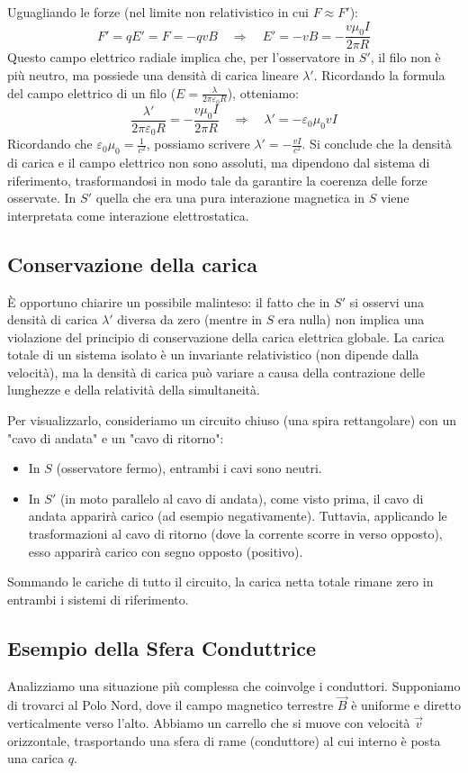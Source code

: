 \documentclass{book}
\begin{document}
Uguagliando le forze (nel limite non relativistico in cui $F \approx F'$):
$$
F' = qE' = F = -qvB \quad \Rightarrow \quad E' = -vB = -\frac{v\mu_0I}{2\pi R}
$$
Questo campo elettrico radiale implica che, per l'osservatore in $S'$, il filo non è più neutro, ma possiede una densità di carica lineare $\lambda'$. Ricordando la formula del campo elettrico di un filo ($E = \frac{\lambda}{2\pi \varepsilon_0 R}$), otteniamo:
$$
\frac{\lambda'}{2\pi \varepsilon_0 R} = -\frac{v\mu_0I}{2\pi R} \quad \Rightarrow \quad \lambda' = -\varepsilon_0\mu_0 v I
$$
Ricordando che $\varepsilon_0 \mu_0 = \frac{1}{c^2}$, possiamo scrivere $\lambda' = -\frac{vI}{c^2}$.
Si conclude che la densità di carica e il campo elettrico non sono assoluti, ma dipendono dal sistema di riferimento, trasformandosi in modo tale da garantire la coerenza delle forze osservate. In $S'$ quella che era una pura interazione magnetica in $S$ viene interpretata come interazione elettrostatica.

\subsection*{Conservazione della carica}
È opportuno chiarire un possibile malinteso: il fatto che in $S'$ si osservi una densità di carica $\lambda'$ diversa da zero (mentre in $S$ era nulla) non implica una violazione del principio di conservazione della carica elettrica globale. La carica totale di un sistema isolato è un invariante relativistico (non dipende dalla velocità), ma la densità di carica può variare a causa della contrazione delle lunghezze e della relatività della simultaneità.

Per visualizzarlo, consideriamo un circuito chiuso (una spira rettangolare) con un "cavo di andata" e un "cavo di ritorno":
\begin{itemize}
    \item In $S$ (osservatore fermo), entrambi i cavi sono neutri.
    \item In $S'$ (in moto parallelo al cavo di andata), come visto prima, il cavo di andata apparirà carico (ad esempio negativamente). Tuttavia, applicando le trasformazioni al cavo di ritorno (dove la corrente scorre in verso opposto), esso apparirà carico con segno opposto (positivo).
\end{itemize}
Sommando le cariche di tutto il circuito, la carica netta totale rimane zero in entrambi i sistemi di riferimento.

\subsection*{Esempio della Sfera Conduttrice}
Analizziamo una situazione più complessa che coinvolge i conduttori.
Supponiamo di trovarci al Polo Nord, dove il campo magnetico terrestre $\vec{B}$ è uniforme e diretto verticalmente verso l'alto. Abbiamo un carrello che si muove con velocità $\vec{v}$ orizzontale, trasportando una sfera di rame (conduttore) al cui interno è posta una carica $q$.
\end{document}
